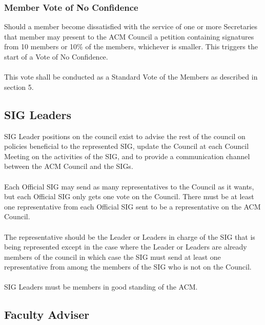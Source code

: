 \documentclass[12pt,titlepage]{article}
\begin{document}
\subsubsection{Member Vote of No Confidence}

Should a member become dissatisfied with the service of one or more Secretaries that member may present to the ACM Council a petition containing signatures from 10 members or 10\% of the members, whichever is smaller. This triggers the start of a Vote of No Confidence.\\
\\
This vote shall be conducted as a Standard Vote of the Members as described in section 5.

\subsection{SIG Leaders}

SIG Leader positions on the council exist to advise the rest of the council on policies beneficial to the represented SIG, update the Council at each Council Meeting on the activities of the SIG, and to provide a communication channel between the ACM Council and the SIGs.\\
\\
Each Official SIG may send as many representatives to the Council as it wants, but each Official SIG only gets one vote on the Council. There must be at least one representative from each Official SIG sent to be a representative on the ACM Council.\\
\\
The representative should be the Leader or Leaders in charge of the SIG that is being represented except in the case where the Leader or Leaders are already members of the council in which case the SIG must send at least one representative from among the members of the SIG who is not on the Council.\\
\\
SIG Leaders must be members in good standing of the ACM.

\subsection{Faculty Adviser}
\end{document}
